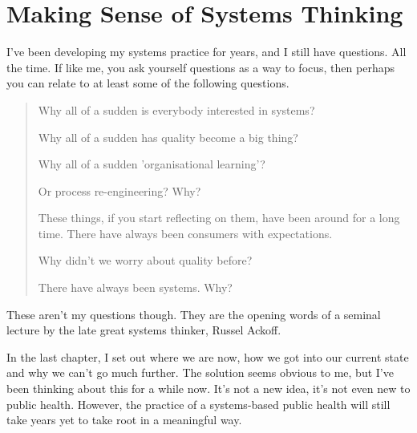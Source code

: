 \chapter*{Making Sense of Systems Thinking}



I've been developing my systems practice for years, and I still have questions. All the time. If like me, you ask yourself questions as a way to focus, then perhaps you can relate to at least some of the following questions.

\begin{quotation}
Why all of a sudden is everybody interested in systems?

Why all of a sudden has quality become a big thing?

Why all of a sudden 'organisational learning'?

Or process re-engineering? Why?

These things, if you start reflecting on them, have been around for a long time. There have always been consumers with expectations. 

Why didn't we worry about quality before?

There have always been systems. Why?
\end{quotation}

These aren't my questions though. They are the opening words of a seminal lecture by the late great systems thinker, Russel Ackoff.\cite{Ackoff93}


 In the last chapter, I set out where we are now, how we got into our current state and why we can't go much further. The solution seems obvious to me, but I've been thinking about this for a while now. It's not a new idea, it's not even new to public health. However, the practice of a systems-based public health will still take years yet to take root in a meaningful way.

